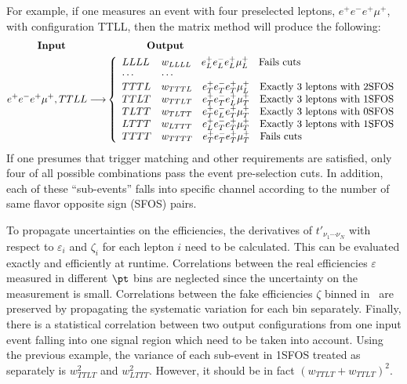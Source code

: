 For example, if one measures an event with four preselected leptons,
$e^+e^-e^+\mu^+$, with configuration TTLL, then the matrix method will produce
the following:
\begin{align*}
  \textrm{\textbf{Input}} \qquad\qquad & \qquad\qquad\textrm{\textbf{Output}} \\
  e^+e^-e^+\mu^+, TTLL \longrightarrow& \left\{
  \begin{array}{ll}
    LLLL & w_{LLLL} \quad e^+_Le^-_Le^+_L\mu^+_L \quad \textrm{Fails cuts} \\
    \cdots & \cdots \\
    TTTL & w_{TTTL} \quad e^+_Te^-_Te^+_T\mu^+_L \quad \textrm{Exactly 3 leptons with 2SFOS} \\
    TTLT & w_{TTLT} \quad e^+_Te^-_Te^+_L\mu^+_T \quad \textrm{Exactly 3 leptons with 1SFOS} \\
    TLTT & w_{TLTT} \quad e^+_Te^-_Le^+_T\mu^+_T \quad \textrm{Exactly 3 leptons with 0SFOS} \\
    LTTT & w_{LTTT} \quad e^+_Le^-_Te^+_T\mu^+_T \quad \textrm{Exactly 3 leptons with 1SFOS} \\
    TTTT & w_{TTTT} \quad e^+_Te^-_Te^+_T\mu^+_T \quad \textrm{Fails cuts}
  \end{array}
  \right.
\end{align*}
If one presumes that trigger matching and other requirements are satisfied, only four of all possible combinations pass the event pre-selection cuts. In addition, each of these ``sub-events'' falls into specific channel according to the number of same flavor opposite sign (SFOS) pairs.

To propagate uncertainties on the efficiencies, the derivatives of $t'_{\nu_1\cdots\nu_N}$ with respect to $\varepsilon_i$ and $\zeta_i$ for each lepton $i$ need to be calculated. This can be evaluated exactly and efficiently at runtime. Correlations between the real efficiencies $\varepsilon$ measured in different  $\pt$ bins are neglected since the uncertainty on the measurement is small. Correlations between the fake efficiencies $\zeta$ binned in \pt\ are preserved by propagating the systematic variation for each bin separately. Finally, there is a statistical correlation between two output configurations from one input event falling into one signal region which need to be taken into account. Using the previous example, the variance of each sub-event in 1SFOS treated as separately is $w^2_{TTLT}$ and $w^2_{LTTT}$. However, it should be in fact $(w_{TTLT} +w_{TTLT})^2$. %


